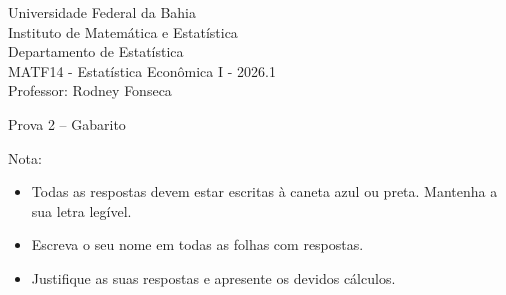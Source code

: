 \documentclass{article}
\date{--/--/----} %
\begin{document}
\begin{flushleft}
	Universidade Federal da Bahia\\
	Instituto de Matemática e Estatística\\
	Departamento de Estatística\\
	MATF14 - Estatística Econômica I - 2026.1\\
	Professor: Rodney Fonseca \\
\end{flushleft}

\begin{center}
	\begin{Large}
		Prova 2 {\color{blue} -- Gabarito } \\
	\end{Large}	
\end{center}

\hspace{2em} Nota: 

\vspace{1em}

\begin{flushleft}
\begin{small}

\begin{itemize}
	\item Todas as respostas devem estar escritas à caneta azul ou preta. Mantenha a sua letra legível.
	\item Escreva o seu nome em todas as folhas com respostas.
	\item Justifique as suas respostas e apresente os devidos cálculos.
\end{itemize}

\end{small}
\end{flushleft}

\vspace{1em}
\end{document}
